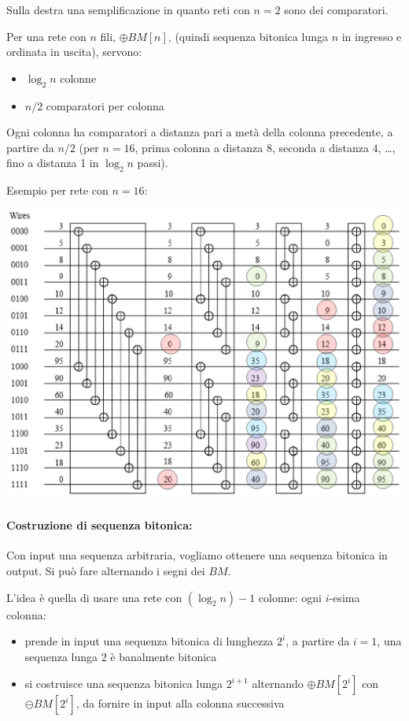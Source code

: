\begin{center}
    
    
\end{center}

Sulla destra una semplificazione in quanto reti con $n = 2$ sono dei comparatori.

Per una rete con $n$ fili, $\oplus BM [n]$, (quindi sequenza bitonica lunga $n$ in ingresso e ordinata in uscita), servono: 
\begin{itemize}
    \item $\log_2 n$ colonne
    
    \item $n/2$ comparatori per colonna
\end{itemize}

Ogni colonna ha comparatori a distanza pari a metà della colonna precedente, a partire da $n/2$ (per $n=16$, prima colonna a distanza $8$, seconda a distanza $4$, \dots, fino a distanza 1 in $\log_2 n$ passi). 

Esempio per rete con $n = 16$:
\begin{center}
    \includegraphics[width=0.79\columnwidth]{img/pattern/n16}
\end{center}

\paragraph{Costruzione di sequenza bitonica:} Con input una sequenza arbitraria, vogliamo ottenere una sequenza bitonica in output. Si può fare alternando i segni dei $BM$.

L'idea è quella di usare una rete con $(\log_2 n) - 1$ colonne: ogni $i$-esima colonna:
\begin{itemize}
    \item prende in input una sequenza bitonica di lunghezza $2^i$, a partire da $i=1$, una sequenza lunga 2 è banalmente bitonica
    
    \item si costruisce una sequenza bitonica lunga $2^{i+1}$ alternando $\oplus BM[2^i]$ con $\ominus BM[2^i]$, da fornire in input alla colonna successiva
\end{itemize}

